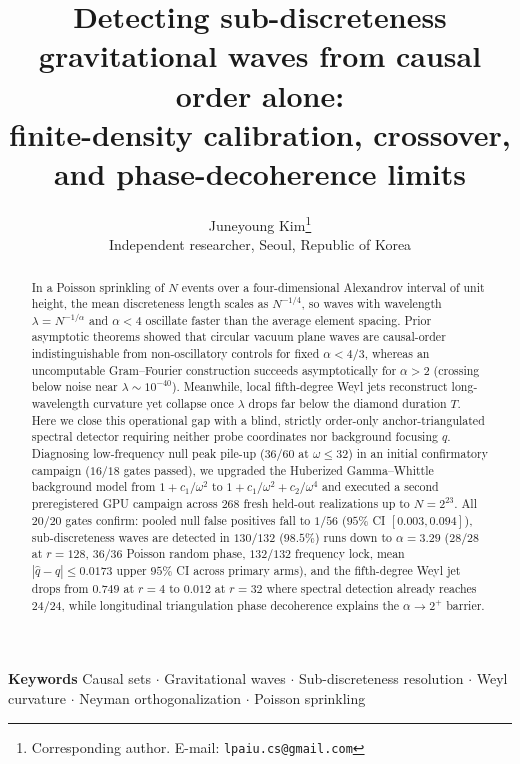 \documentclass[11pt,a4paper]{article}
\title{Detecting sub-discreteness gravitational waves from causal order alone:\\
finite-density calibration, crossover, and phase-decoherence limits}
\author{Juneyoung Kim\thanks{Corresponding author. E-mail: \texttt{lpaiu.cs@gmail.com}}\\
\small Independent researcher, Seoul, Republic of Korea}
\date{}
\begin{document}
\maketitle

\begin{abstract}
In a Poisson sprinkling of $N$ events over a four-dimensional Alexandrov
interval of unit height, the mean discreteness length scales as $N^{-1/4}$, so
waves with wavelength $\lambda = N^{-1/\alpha}$ and $\alpha < 4$ oscillate faster
than the average element spacing. Prior asymptotic theorems showed that circular
vacuum plane waves are causal-order indistinguishable from non-oscillatory
controls for fixed $\alpha < 4/3$,
whereas an uncomputable Gram--Fourier construction succeeds asymptotically for
$\alpha > 2$ (crossing below noise near $\lambda \sim 10^{-40}$). Meanwhile,
local fifth-degree Weyl jets reconstruct long-wavelength curvature yet collapse
once $\lambda$ drops far below the diamond duration $T$. Here we close this
operational gap with a blind, strictly order-only anchor-triangulated spectral
detector requiring neither probe coordinates nor background focusing $q$.
Diagnosing low-frequency null peak pile-up ($36/60$ at $\omega \le 32$) in an
initial confirmatory campaign ($16/18$ gates passed), we upgraded the
Huberized Gamma--Whittle background model from $1+c_1/\omega^2$ to
$1+c_1/\omega^2+c_2/\omega^4$ and executed a second preregistered GPU campaign
across $268$ fresh held-out realizations up to $N = 2^{23}$. All $20/20$ gates
confirm: pooled null false positives fall to $1/56$ ($95\%$ CI
$[0.003,0.094]$), sub-discreteness waves are detected in $130/132$ ($98.5\%$)
runs down to $\alpha = 3.29$ ($28/28$ at $r=128$, $36/36$ Poisson random phase,
$132/132$ frequency lock, mean $|\hat{q}-q| \le 0.0173$ upper $95\%$ CI across
primary arms), and the fifth-degree Weyl jet drops from $0.749$ at $r=4$ to
$0.012$ at $r=32$ where spectral detection already reaches $24/24$, while
longitudinal triangulation phase decoherence explains the $\alpha \to 2^+$
barrier.
\end{abstract}

\noindent\textbf{Keywords} Causal sets $\cdot$ Gravitational waves $\cdot$
Sub-discreteness resolution $\cdot$ Weyl curvature $\cdot$
Neyman orthogonalization $\cdot$ Poisson sprinkling
\end{document}
